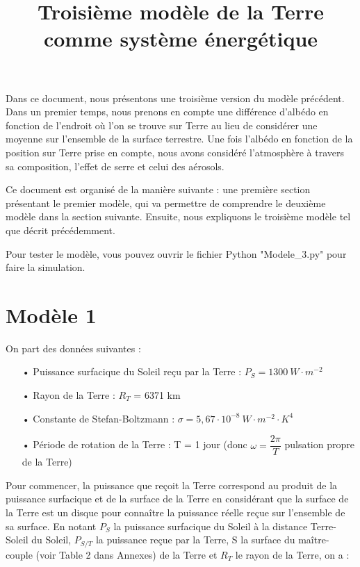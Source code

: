 \documentclass[a4paper,11pt]{article}
\title{Troisième modèle de la Terre comme système énergétique}
\begin{document}
\maketitle

Dans ce document, nous présentons une troisième version du modèle précédent. Dans un premier temps, nous prenons en compte une différence d'albédo en fonction de l'endroit où l'on se trouve sur Terre au lieu de considérer une moyenne sur l'ensemble de la surface terrestre. Une fois l'albédo en fonction de la position sur Terre prise en compte, nous avons considéré l'atmosphère à travers sa composition, l'effet de serre et celui des aérosols.

Ce document est organisé de la manière suivante : une première section présentant le premier modèle, qui va permettre de comprendre le deuxième modèle dans la section suivante. Ensuite, nous expliquons le troisième modèle tel que décrit précédemment.

Pour tester le modèle, vous pouvez ouvrir le fichier Python "Modele\_3.py" pour faire la simulation.


\section{Modèle 1}

On part des données suivantes :

\begin{enumerate}

\item[•] Puissance surfacique du Soleil reçu par la Terre : $P_S = 1300 ~ W \cdot m^{-2}$
\item[•] Rayon de la Terre : $R_T$ = 6371 km
\item[•] Constante de Stefan-Boltzmann : $\sigma = 5,67 \cdot 10^{-8} ~ W \cdot m^{-2} \cdot K^4$ 
\item[•] Période de rotation de la Terre : T = 1 jour (donc $\omega = \dfrac{2\pi}{T}$ pulsation propre de la Terre)

\end{enumerate}

Pour commencer, la puissance que reçoit la Terre correspond au produit de la puissance surfacique et de la surface de la Terre en considérant que la surface de la Terre est un disque pour connaître la puissance réelle reçue sur l'ensemble de sa surface. En notant $P_S$ la puissance surfacique du Soleil à la distance Terre-Soleil du Soleil, $P_{S/T}$ la puissance reçue par la Terre, S la surface du maître-couple (voir Table 2 dans Annexes) de la Terre et $R_T$ le rayon de la Terre, on a :
\end{document}
